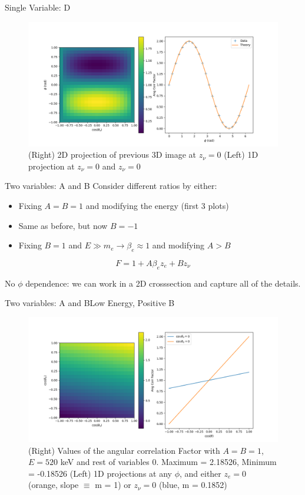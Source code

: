 \documentclass{beamer}
\begin{document}
\begin{frame}{Single Variable: D}
	\begin{figure}
		\centering
		\includegraphics[width=0.8\paperwidth]{plots/crosssections_D.png}
		\caption{(Right) 2D projection of previous 3D image at $z_\nu = 0$ (Left) 1D projection at $z_\nu = 0$ and $z_\nu = 0$ }
	\end{figure}
\end{frame}
\begin{frame}{Two variables: A and B}
	Consider different ratios by either:
	\begin{itemize}
		\item Fixing $A = B = 1$ and modifying the energy (first 3 plots)
		\item Same as before, but now $B = -1$
		\item Fixing $B = 1$ and $E \gg m_e \rightarrow \beta_e \approx 1$ and modifying $A > B$
	\end{itemize}
		
	$$F = 1 + A\beta_ez_e + Bz_\nu$$
		
	No $\phi$ dependence: we can work in a 2D crosssection and capture all of the details.
	
\end{frame}
\begin{frame}{Two variables: A and B}{Low Energy, Positive B}
	\begin{figure}
		\centering
		\includegraphics[width=0.8\paperwidth]{plots/posA_posB_lowE.png}
		\caption{(Right) Values of the angular correlation Factor with $A = B = 1$, $E = 520$ keV and rest of variables 0. Maximum = 2.18526, Minimum = -0.18526 (Left) 1D projections at any $\phi$, and either $z_e = 0$ (orange, slope $\equiv$ m = 1) or $z_\nu = 0$ (blue, m = 0.1852)}	
	\end{figure}
\end{frame}
\end{document}
